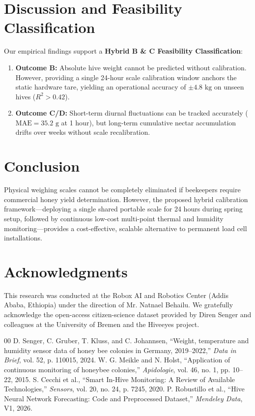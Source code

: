 \documentclass[10pt,twocolumn]{article}
\begin{document}
\section{Discussion and Feasibility Classification}
Our empirical findings support a \textbf{Hybrid B \& C Feasibility Classification}:
\begin{enumerate}
    \item \textbf{Outcome B:} Absolute hive weight cannot be predicted without calibration. However, providing a single 24-hour scale calibration window anchors the static hardware tare, yielding an operational accuracy of $\pm4.8\text{ kg}$ on unseen hives ($R^2 > 0.42$).
    \item \textbf{Outcome C/D:} Short-term diurnal fluctuations can be tracked accurately ($\text{MAE} = 35.2\text{ g}$ at 1 hour), but long-term cumulative nectar accumulation drifts over weeks without scale recalibration.
\end{enumerate}

\section{Conclusion}
Physical weighing scales cannot be completely eliminated if beekeepers require commercial honey yield determination. However, the proposed hybrid calibration framework---deploying a single shared portable scale for 24 hours during spring setup, followed by continuous low-cost multi-point thermal and humidity monitoring---provides a cost-effective, scalable alternative to permanent load cell installations.

\section*{Acknowledgments}
This research was conducted at the Robox AI and Robotics Center (Addis Ababa, Ethiopia) under the direction of Mr. Natnael Behailu. We gratefully acknowledge the open-access citizen-science dataset provided by Diren Senger and colleagues at the University of Bremen and the Hiveeyes project.

{\small
\begin{thebibliography}{00}
\setlength{\itemsep}{1pt}
 D. Senger, C. Gruber, T. Kluss, and C. Johannsen, ``Weight, temperature and humidity sensor data of honey bee colonies in Germany, 2019--2022,'' \textit{Data in Brief}, vol. 52, p. 110015, 2024.
 W. G. Meikle and N. Holst, ``Application of continuous monitoring of honeybee colonies,'' \textit{Apidologie}, vol. 46, no. 1, pp. 10--22, 2015.
 S. Cecchi et al., ``Smart In-Hive Monitoring: A Review of Available Technologies,'' \textit{Sensors}, vol. 20, no. 24, p. 7245, 2020.
 P. Robustillo et al., ``Hive Neural Network Forecasting: Code and Preprocessed Dataset,'' \textit{Mendeley Data}, V1, 2026.
\end{thebibliography}
}
\end{document}
